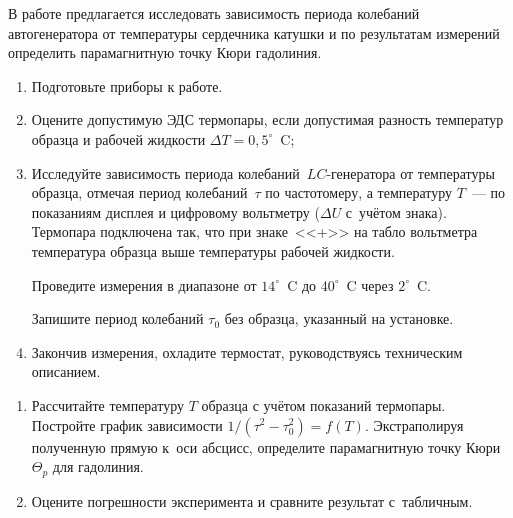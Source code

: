 \begin{lab:task}

	В работе предлагается исследовать зависимость периода колебаний автогенератора от температуры сердечника катушки и по
	результатам измерений определить парамагнитную точку Кюри гадолиния.
	
	\begin{enumerate}
		\item Подготовьте приборы к работе.
		
		\item Оцените допустимую ЭДС термопары, если допустимая разность температур образца и рабочей жидкости $\Delta T=0,5^\circ$~C;
		
		\item Исследуйте зависимость периода колебаний~$LC$-генератора от температуры образца, отмечая период колебаний~$\tau$
		по частотомеру, а температуру $T$~--- по показаниям дисплея и цифровому вольтметру ($\Delta U$ с~учётом знака). Термопара
		подключена так, что при знаке~<<+>> на табло вольтметра температура образца выше температуры рабочей жидкости.
		
		Проведите измерения в диапазоне от $14^\circ$~C до $40^\circ$~C через $2^\circ$~C.
		
		Запишите период колебаний $\tau_0$ без образца, указанный на установке.
		
		\item Закончив измерения, охладите термостат, руководствуясь техническим описанием.
	
	\end{enumerate}
	
	\begin{enumerate}
	
		\item Рассчитайте температуру $T$ образца с учётом показаний термопары. Постройте график зависимости $1/(\tau^2-\tau_0^2)=f(T)$. 
		Экстраполируя полученную прямую к~оси абсцисс, определите парамагнитную точку Кюри~$\Theta_p$ для гадолиния.
	
		\item Оцените погрешности эксперимента и сравните результат с~табличным.
	
	\end{enumerate}

\end{lab:task}


